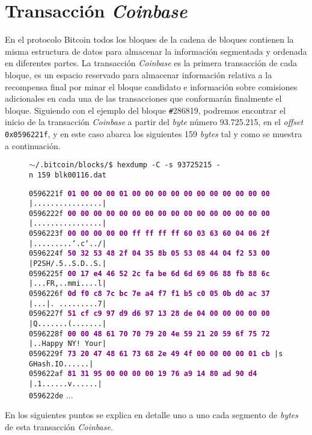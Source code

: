 \documentclass{article}
\begin{document}
\section{Transacción \textit{Coinbase}}
    En el protocolo Bitcoin todos los bloques de la cadena de bloques contienen la misma estructura de datos para almacenar la información segmentada y ordenada en diferentes partes. La transacción \textit{Coinbase} es la primera transacción de cada bloque, es un espacio reservado para almacenar información relativa a la recompensa final por minar el bloque candidato e información sobre comisiones adicionales en cada una de las transacciones que conformarán finalmente el bloque. Siguiendo con el ejemplo del bloque \texttt{\#}286819, podremos encontrar el inicio de la transacción \textit{Coinbase} a partir del \textit{byte} número 93.725.215, en el \textit{offset} \texttt{0x0596221f}, y en este caso abarca los siguientes 159 \textit{bytes} tal y como se muestra a continuación.
    \begin{figure}[H]
    \scriptsize{\texttt{$\sim$/.bitcoin/blocks/\$ hexdump\ -C\ -s\ 93725215\ -n\ 159\ blk00116.dat}}
        
        \scriptsize{
        \texttt{0596221f \textbf{\textcolor{purple}{01 00 00 00 01 00 00 00  00 00 00 00 00 00 00 00}} |................|} \\
        \texttt{0596222f \textbf{\textcolor{purple}{00 00 00 00 00 00 00 00  00 00 00 00 00 00 00 00}} |................|} \\
        \texttt{0596223f \textbf{\textcolor{purple}{00 00 00 00 00 ff ff ff  ff 60 03 63 60 04 06 2f}} |.........`.c`../|} \\
        \texttt{0596224f \textbf{\textcolor{purple}{50 32 53 48 2f 04 35 8b  05 53 08 44 04 f2 53 00}} |P2SH/.5..S.D..S.|} \\
        \texttt{0596225f \textbf{\textcolor{purple}{00 17 e4 46 52 2c fa be  6d 6d 69 06 88 fb 88 6c}} |...FR,..mmi....l|} \\
        \texttt{0596226f \textbf{\textcolor{purple}{0d f0 c8 7c bc 7e a4 f7  f1 b5 c0 05 0b d0 ac 37}} |...|.~.........7|} \\
        \texttt{0596227f \textbf{\textcolor{purple}{51 cf c9 97 d9 d6 97 13  28 de 04 00 00 00 00 00}} |Q.......(.......|} \\
        \texttt{0596228f \textbf{\textcolor{purple}{00 00 48 61 70 70 79 20  4e 59 21 20 59 6f 75 72}} |..Happy NY! Your|} \\
        \texttt{0596229f \textbf{\textcolor{purple}{73 20 47 48 61 73 68 2e  49 4f 00 00 00 00 01 cb}} |s GHash.IO......|} \\
        \texttt{059622af \textbf{\textcolor{purple}{81 31 95 00 00 00 00 19  76 a9 14 80 ad 90 d4 \ \ }} |.1......v......|} \\
        \texttt{059622de} ...}
    \end{figure}
    En los siguientes puntos se explica en detalle uno a uno cada segmento de \textit{bytes} de esta transacción \textit{Coinbase}.
    
\end{document}

